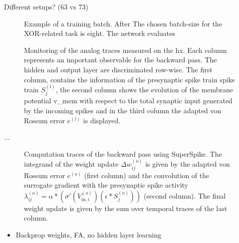 Different setups? (63 vs 73)


\begin{figure}
	\centering
	
	\caption[Example of a training batch.]{Example of a training batch. After The chosen batch-size for the XOR-related task is eight. The network evaluates}
	\label{inputofabatch}
\end{figure}


\begin{figure}
	\centering
	
	\caption[Monitoring of the analog traces measured on the \gls{hx}.]{Monitoring of the analog traces measured on the \gls{hx}. Each column represents an important observable for the backward pass. The hidden and output layer are discriminated row-wise. The first column, contains the information of the presynaptic spike train spike train $S_j^{(l)}$, the second column shows the evolution of the membrane potential \gls{v_mem} with respect to the total synaptic input generated by the incoming spikes and in the third column the adapted von Rossum error $e^{(l)}$ is displayed.}
	\label{debugplot}
\end{figure}

...
\begin{figure}
	\centering
	
	\caption[Traces in the backward pass using SuperSpike.]{Computation traces of the backward pass using SuperSpike. The integrand of the weight update $\Delta w_{ij}^{(o)}$ is given by the adapted von Rossum error $e^{(o)}$ (first column) and the convolution of the surrogate gradient with the presynaptic spike activity $\lambda_{ij}^{(o)} = \alpha \ast \left(\sigma'(V_{\text{m},i}^{(o)}) \left(\epsilon \ast S_j^{(o)}\right)\right)$ (second column). The final weight update is given by the sum over temporal traces of the last column.}
	\label{weightchangesplot}
\end{figure}


\begin{itemize}
	\item Backprop weights, FA, no hidden layer learning
\end{itemize}